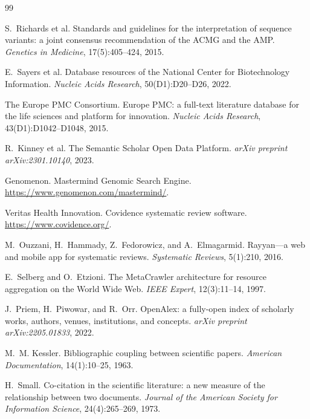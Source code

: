 \documentclass[sigconf,screen]{acmart}
\begin{document}

\begin{thebibliography}{99}

S.~Richards et al.
\newblock Standards and guidelines for the interpretation of sequence
variants: a joint consensus recommendation of the ACMG and the AMP.
\newblock \emph{Genetics in Medicine}, 17(5):405--424, 2015.

E.~Sayers et al.
\newblock Database resources of the National Center for Biotechnology
Information.
\newblock \emph{Nucleic Acids Research}, 50(D1):D20--D26, 2022.

The Europe PMC Consortium.
\newblock Europe PMC: a full-text literature database for the life sciences
and platform for innovation.
\newblock \emph{Nucleic Acids Research}, 43(D1):D1042--D1048, 2015.

R.~Kinney et al.
\newblock The Semantic Scholar Open Data Platform.
\newblock \emph{arXiv preprint arXiv:2301.10140}, 2023.

Genomenon.
\newblock Mastermind Genomic Search Engine.
\newblock \url{https://www.genomenon.com/mastermind/}.

Veritas Health Innovation.
\newblock Covidence systematic review software.
\newblock \url{https://www.covidence.org/}.

M.~Ouzzani, H.~Hammady, Z.~Fedorowicz, and A.~Elmagarmid.
\newblock Rayyan---a web and mobile app for systematic reviews.
\newblock \emph{Systematic Reviews}, 5(1):210, 2016.

E.~Selberg and O.~Etzioni.
\newblock The MetaCrawler architecture for resource aggregation on the
World Wide Web.
\newblock \emph{IEEE Expert}, 12(3):11--14, 1997.

J.~Priem, H.~Piwowar, and R.~Orr.
\newblock OpenAlex: a fully-open index of scholarly works, authors, venues,
institutions, and concepts.
\newblock \emph{arXiv preprint arXiv:2205.01833}, 2022.

M.~M. Kessler.
\newblock Bibliographic coupling between scientific papers.
\newblock \emph{American Documentation}, 14(1):10--25, 1963.

H.~Small.
\newblock Co-citation in the scientific literature: a new measure of the
relationship between two documents.
\newblock \emph{Journal of the American Society for Information Science},
24(4):265--269, 1973.


\end{thebibliography}
\end{document}
